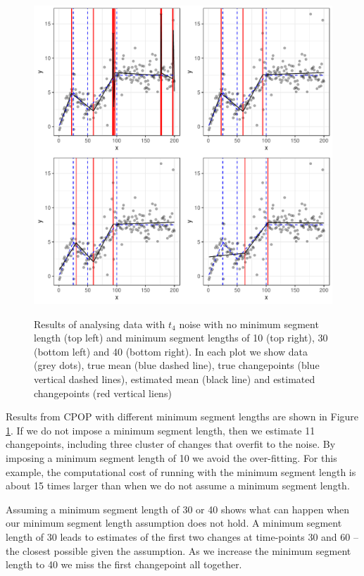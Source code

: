 \documentclass[article]{jss}
\begin{document}
\begin{figure}
\centering
{\includegraphics[scale=.5]{figures/cpop_minseg_ggplot.pdf}}
\caption{Results of analysing data with $t_4$ noise with no minimum segment length (top left) and minimum segment lengths of 10 (top right), 30 (bottom left) and 40 (bottom right). In each plot we show data (grey dots), true mean (blue dashed line), true changepoints (blue vertical dashed lines), estimated mean (black line) and estimated changepoints (red vertical liens)}
\label{fig:cpop-minseg}
\end{figure}
%
%
Results from CPOP with different minimum segment lengths are shown in Figure \ref{fig:cpop-minseg}. If we do not impose a minimum segment length, then we estimate 11 changepoints, including three cluster of changes that overfit to the noise. By imposing a minimum segment length of 10 we avoid the over-fitting. For this example, the computational cost of running  with the minimum segment length is about 15 times larger than when we do not assume a minimum segment length.

Assuming a minimum segment length of 30 or 40 shows what can happen when our minimum segment length assumption does not hold. A minimum segment length of 30 leads to estimates of the first two changes at time-points 30 and 60 -- the closest possible given the assumption. As we increase the minimum segment length to 40 we miss the first changepoint all together. 
\end{document}
